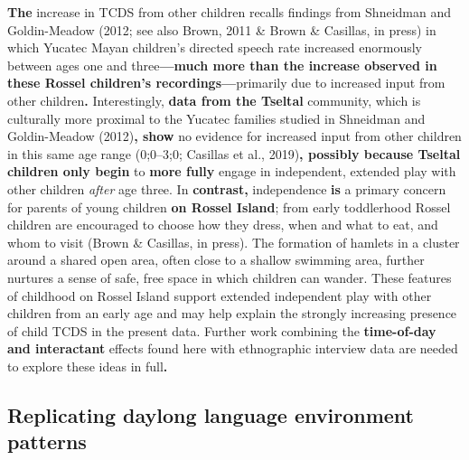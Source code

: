 \documentclass[,man,floatsintext]{apa6}
\begin{document}
\textbf{The} increase in TCDS from other children recalls findings from
Shneidman and Goldin-Meadow (2012; see also Brown, 2011 \& Brown \&
Casillas, in press) in which Yucatec Mayan children's directed speech
rate increased enormously between ages one and three\textbf{---much more
than the increase observed in these Rossel children's
recordings---}primarily due to increased input from other
children\textbf{.} Interestingly, \textbf{data from the Tseltal}
community, which is culturally more proximal to the Yucatec families
studied in Shneidman and Goldin-Meadow (2012)\textbf{, show} no evidence
for increased input from other children in this same age range
(0;0--3;0; Casillas et al., 2019)\textbf{, possibly because Tseltal
children only begin} to \textbf{more fully} engage in independent,
extended play with other children \emph{after} age three. In
\textbf{contrast,} independence \textbf{is} a primary concern for
parents of young children \textbf{on Rossel Island}; from early
toddlerhood Rossel children are encouraged to choose how they dress,
when and what to eat, and whom to visit (Brown \& Casillas, in press).
The formation of hamlets in a cluster around a shared open area, often
close to a shallow swimming area, further nurtures a sense of safe, free
space in which children can wander. These features of childhood on
Rossel Island support extended independent play with other children from
an early age and may help explain the strongly increasing presence of
child TCDS in the present data. Further work combining the
\textbf{time-of-day and interactant} effects found here with
ethnographic interview data are needed to explore these ideas in
full\textbf{.}

\subsection{\texorpdfstring{\textbf{Replicating daylong language
environment
patterns}}{Replicating daylong language environment patterns}}\label{replicating-daylong-language-environment-patterns}
\end{document}
